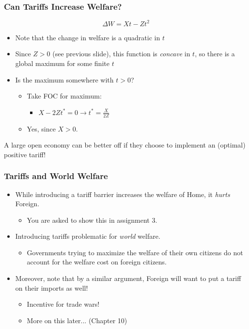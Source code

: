 \documentclass{beamer}
\begin{document}
\begin{frame}
	\frametitle{Can Tariffs Increase Welfare?}
\begin{equation}
\Delta W = Xt - Zt^2 \nonumber
\end{equation}
\begin{itemize}
	\item Note that the change in welfare is a quadratic in $t$ 
	\item Since $Z>0$ (see previous slide), this function is \emph{concave} in $t$, so there is a global maximum for some finite $t$
	\item Is the maximum somewhere with $t>0$?
		\begin{itemize}
			\item Take FOC for maximum:
				\begin{itemize}
					\item $X - 2Zt^*=0 \rightarrow t^*= \frac{X}{2Z}$ 
				\end{itemize}
			\item Yes, since $X>0$.
			
		\end{itemize}
\end{itemize}
\begin{center}
	A large open economy can be better off if they choose to implement an (optimal) positive tariff!
\end{center}

\end{frame}
\begin{frame}
	\frametitle{Tariffs and World Welfare}
\begin{itemize}
	\item While introducing a tariff barrier increases the welfare of Home, it \emph{hurts} Foreign.
		\begin{itemize}
			\item You are asked to show this in assignment 3.
		\end{itemize}
	\item Introducing tariffs problematic for \emph{world} welfare.
	\begin{itemize}
				\item Governments trying to maximize the welfare of their own citizens do not account for the welfare cost on foreign citizens.
	\end{itemize}
	
	\item Moreover, note that by a similar argument, Foreign will want to put a tariff on their imports as well!
		\begin{itemize}
			\item Incentive for trade wars! 
			\item More on this later... (Chapter 10)
		\end{itemize}

\end{itemize}
\end{frame}
\end{document}
